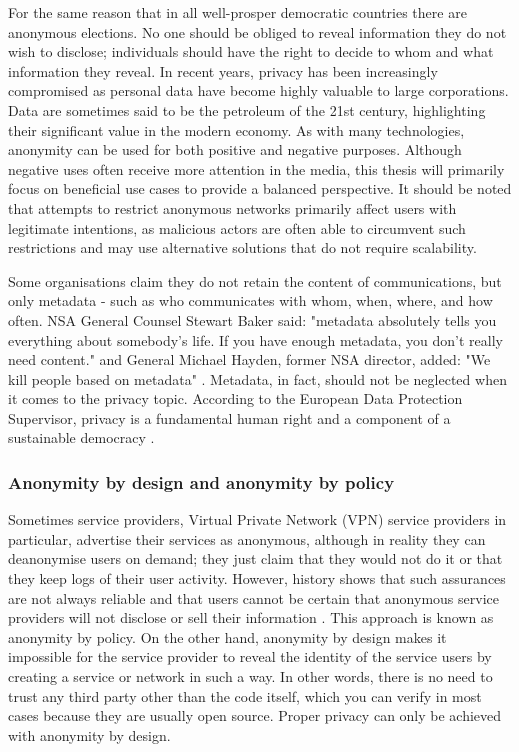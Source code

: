 For the same reason that in all well-prosper democratic countries there are anonymous elections. No one should be obliged to reveal information they do not wish to disclose; individuals should have the right to decide to whom and what information they reveal. In recent years, privacy has been increasingly compromised as personal data have become highly valuable to large corporations. Data are sometimes said to be the petroleum of the 21st century, highlighting their significant value in the modern economy.
As with many technologies, anonymity can be used for both positive and negative purposes. Although negative uses often receive more attention in the media, this thesis will primarily focus on beneficial use cases to provide a balanced perspective.
It should be noted that attempts to restrict anonymous networks primarily affect users with legitimate intentions, as malicious actors are often able to circumvent such restrictions and may use alternative solutions that do not require scalability.

Some organisations claim they do not retain the content of communications, but only metadata - such as who communicates with whom, when, where, and how often. NSA General Counsel Stewart Baker said: "metadata absolutely tells you everything about somebody’s life. If you have enough metadata, you don’t really need content." and General Michael Hayden, former NSA director, added: "We kill people based on metadata" \cite{metadata-kill}. Metadata, in fact, should not be neglected when it comes to the privacy topic.
According to the European Data Protection Supervisor, privacy is a fundamental human right and a component of a sustainable democracy \cite{privacy-eu}.

\subsubsection{Anonymity by design and anonymity by policy}
Sometimes service providers, Virtual Private Network (VPN) service providers in particular, advertise their services as anonymous, although in reality they can deanonymise users on demand; they just claim that they would not do it or that they keep logs of their user activity. However, history shows that such assurances are not always reliable and that users cannot be certain that anonymous service providers will not disclose or sell their information \cite{vpns}. This approach is known as anonymity by policy.
On the other hand, anonymity by design makes it impossible for the service provider to reveal the identity of the service users by creating a service or network in such a way. In other words, there is no need to trust any third party other than the code itself, which you can verify in most cases because they are usually open source. Proper privacy can only be achieved with anonymity by design.


